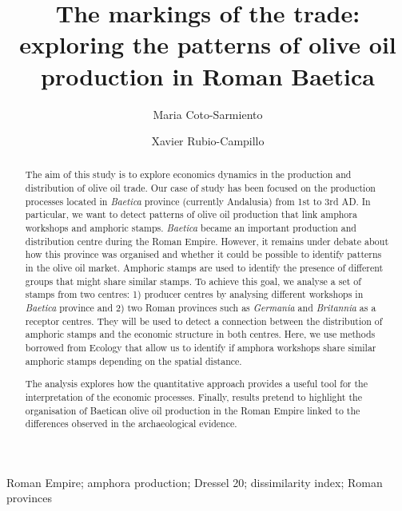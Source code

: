 \documentclass[review]{elsarticle}
\begin{document}
\begin{frontmatter}

\title{The markings of the trade: exploring the patterns of olive oil production in Roman Baetica}

\author[ceipacadress]{Maria Coto-Sarmiento}


\author[edadress]{Xavier Rubio-Campillo}

\address[ceipacadress]{CEIPAC, Department of Prehistory and Archaeology, Montalegre, 6-8, 08001, University of Barcelona, Barcelona, Spain}
\address[edadress]{School of History, Classic \& Archaeology, Room OOM.33, William Robertson Wing, Old Medical School, Teviot Place, University of Edinburgh, UK}

\begin{keyword}
Roman Empire; amphora production; Dressel 20; dissimilarity index; Roman provinces
\end{keyword}


\begin{abstract}

The aim of this study is to explore economics dynamics in the production and distribution of olive oil trade. 
Our case of study has been focused on the production processes located in \textit{Baetica} province (currently Andalusia) from 1st to 3rd AD. In particular, we want to detect patterns of olive oil production that link amphora workshops and amphoric stamps. \textit{Baetica} became an important production and distribution centre during the Roman Empire. However, it remains under debate about how this province was organised and whether it could be possible to identify patterns in the olive oil market. Amphoric stamps are used to identify the presence of different groups that might share similar stamps. To achieve this goal, we analyse a set of stamps from two centres: 1) producer centres by analysing different workshops in \textit{Baetica} province and 2) two Roman provinces such as \textit{Germania} and \textit{Britannia} as a receptor centres. They will be used to detect a connection between the distribution of amphoric stamps and the economic structure in both centres. Here, we use methods borrowed from Ecology that allow us to identify if amphora workshops share similar amphoric stamps depending on the spatial distance. 

The analysis explores how the quantitative approach provides a useful tool for the interpretation of the economic processes. Finally, results pretend to highlight the organisation of Baetican olive oil production in the Roman Empire linked to the differences observed in the archaeological evidence.

\end{abstract}


\end{frontmatter}
\end{document}
